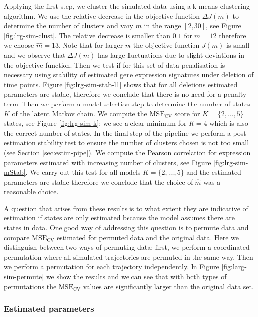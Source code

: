 Applying the first step, we cluster the simulated data using a k-means clustering algorithm. We use the relative decrease in the objective function $\Delta J(m)$ to determine the number of clusters and vary $m$ in the range $[2, 30]$, see Figure \ref{fig:lrg-sim-clust}. The relative decrease is smaller than $0.1$ for $m=12$ therefore we choose $\hat{m} = 13$. Note that for larger $m$ the objective function $J(m)$ is small and we observe that $\Delta J(m)$ has large fluctuations due to slight deviations in the objective function. Then we test if for this set of data penalisation is necessary using stability of estimated gene expression signatures under deletion of time points. Figure \ref{fig:lrg-sim-stab-l1} shows that for all deletions estimated parameters are stable, therefore we conclude that there is no need for a penalty term. Then we perform a model selection step to determine the number of states $K$ of the latent Markov chain. We compute the $\mathrm{MSE_{CV}}$ score for $K=\lbrace 2, \ldots, 5 \rbrace$ states, see Figure \ref{fig:lrg-sim-k}; we see a clear minimum for $K=4$ which is also the correct number of states. In the final step of the pipeline we perform a post-estimation stability test to ensure the number of clusters chosen is not too small (see Section \ref{sec:estim-pipe}). We compute the Pearson correlation for expression parameters estimated with increasing number of clusters, see Figure \ref{fig:lrg-sim-mStab}. We carry out this test for all models $K = \lbrace 2, \ldots, 5\rbrace $ and the estimated parameters are stable therefore we conclude that the choice of $\hat{m}$ was a reasonable choice.

A question that arises from these results is to what extent they are indicative of estimation if states are only estimated because the model assumes there are states in data. One good way of addressing this question is to permute data and compare  $\mathrm{MSE_{CV}}$ estimated for permuted data and the original data. Here we distinguish between two ways of permuting data: first, we perform a coordinated permutation where all simulated trajectories are permuted in the same way. Then we perform a permutation for each trajectory independently. In Figure \ref{fig:larg-sim-permute} we show the results and we can see that with both types of permutations the $\mathrm{MSE_{CV}}$ values are significantly larger than the original data set.


\subsubsection{Estimated parameters}
\label{sec:transition-rates}


